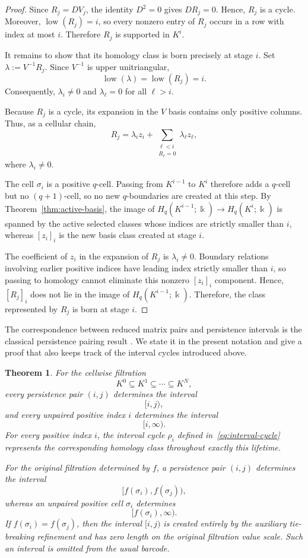 \documentclass[11pt]{article}
\theoremstyle{paperdefinition}
\theoremstyle{paperplain}
\newtheorem{theorem}[definition]{Theorem}
\theoremstyle{paperremark}
\begin{document}
\begin{proof}
Since $R_j=DV_j$, the identity $D^2=0$ gives $DR_j=0$. Hence, $R_j$ is a cycle. Moreover, $\operatorname{low}(R_j)=i$, so every nonzero entry of $R_j$ occurs in a row with index at most $i$. Therefore $R_j$ is supported in $K^i$.

It remains to show that its homology class is born precisely at stage $i$. Set $\lambda:=V^{-1}R_j$. Since $V^{-1}$ is upper unitriangular,
\[
\operatorname{low}(\lambda) = \operatorname{low}(R_j) = i.
\]
Consequently, $\lambda_i\neq 0$ and $\lambda_\ell=0$ for all $\ell>i$.

Because $R_j$ is a cycle, its expansion in the $V$ basis contains only positive columns. Thus, as a cellular chain,
\[
R_j = \lambda_i z_i + \sum_{\substack{\ell<i\\ R_\ell=0}}\lambda_\ell z_\ell,
\]
where $\lambda_i\neq 0$.

The cell $\sigma_i$ is a positive $q$-cell. Passing from $K^{i-1}$ to $K^i$ therefore adds a $q$-cell but no $(q+1)$-cell, so no new $q$-boundaries are created at this step. By Theorem~\ref{thm:active-basis}, the image of $H_q(K^{i-1};\Bbbk) \longrightarrow H_q(K^i;\Bbbk)$ is spanned by the active selected classes whose indices are strictly smaller than $i$, whereas $[z_i]_i$ is the new basis class created at stage $i$.

The coefficient of $z_i$ in the expansion of $R_j$ is $\lambda_i\neq 0$. Boundary relations involving earlier positive indices have leading index strictly smaller than $i$, so passing to homology cannot eliminate this nonzero $[z_i]_i$ component. Hence, $[R_j]_i$ does not lie in the image of $H_q(K^{i-1};\Bbbk)$. Therefore, the class represented by $R_j$ is born at stage $i$.
\end{proof}

The correspondence between reduced matrix pairs and persistence intervals is the classical persistence pairing result \cite{edelsbrunner2002topological,zomorodian2005computing, edelsbrunnerharer2010computational}. We state it in the present notation and give a proof that also keeps track of the interval cycles introduced above.

\begin{theorem}
\label{thm:persistence pairing}
For the cellwise filtration
\[
K^0 \subseteq K^1 \subseteq \cdots \subseteq K^N,
\]
every persistence pair $(i,j)$ determines the interval
\[
[i,j),
\]
and every unpaired positive index $i$ determines the interval
\[
[i,\infty).
\]
For every positive index $i$, the interval cycle $\rho_i$ defined in~\eqref{eq:interval-cycle} represents the corresponding homology class throughout exactly this lifetime.

For the original filtration determined by $f$, a persistence pair $(i,j)$ determines the interval
\[
[f(\sigma_i),f(\sigma_j)),
\]
whereas an unpaired positive cell $\sigma_i$ determines
\[
[f(\sigma_i),\infty).
\]
If $f(\sigma_i)=f(\sigma_j)$, then the interval $[i,j)$ is created entirely by the auxiliary tie-breaking refinement and has zero length on the original filtration value scale. Such an interval is omitted from the usual
barcode.

\end{theorem}
\end{document}
